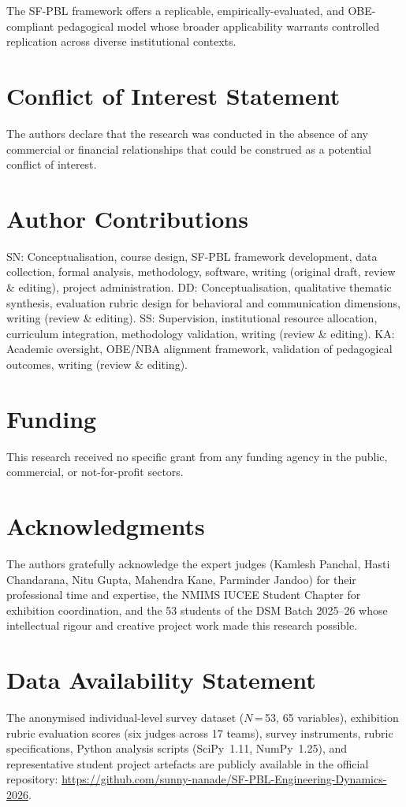 \documentclass[utf8]{FrontiersinHarvard}
\begin{document}
{\color{blue} The SF-PBL framework offers a replicable, empirically-evaluated, and
OBE-compliant pedagogical model whose broader applicability warrants
controlled replication across diverse institutional contexts.}


\section*{Conflict of Interest Statement}
The authors declare that the research was conducted in the absence of any
commercial or financial relationships that could be construed as a potential
conflict of interest.

\section*{Author Contributions}
SN: Conceptualisation, course design, SF-PBL framework development, data
collection, formal analysis, methodology, software, writing (original
draft, review \& editing), project administration.
DD: Conceptualisation, qualitative thematic synthesis, evaluation rubric
design for behavioral and communication dimensions, writing (review \& editing).
SS: Supervision, institutional resource allocation, curriculum integration,
methodology validation, writing (review \& editing).
KA: Academic oversight, OBE/NBA alignment framework, validation of pedagogical
outcomes, writing (review \& editing).

\section*{Funding}
This research received no specific grant from any funding agency in the
public, commercial, or not-for-profit sectors.

\section*{Acknowledgments}
The authors gratefully acknowledge the expert judges (Kamlesh Panchal,
Hasti Chandarana, Nitu Gupta, Mahendra Kane, Parminder Jandoo) for their
professional time and expertise, the NMIMS IUCEE Student Chapter for
exhibition coordination, and the 53 students of the DSM Batch 2025--26
whose intellectual rigour and creative project work made this research
possible.

\section*{Data Availability Statement}
The anonymised individual-level survey dataset ($N$\,=\,53, 65 variables),
exhibition rubric evaluation scores (six judges across 17 teams), survey instruments,
rubric specifications, Python analysis scripts (SciPy~1.11, NumPy~1.25), and
representative student project artefacts are publicly available in the official
repository: \url{https://github.com/sunny-nanade/SF-PBL-Engineering-Dynamics-2026}.
\end{document}
